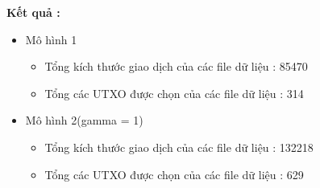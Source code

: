 \noindent
\textbf{Kết quả :}
\begin{itemize}
    \item Mô hình 1
    \begin{itemize}
        \item Tổng kích thước giao dịch của các file dữ liệu : 85470
        \item Tổng các UTXO được chọn của các file dữ liệu : 314
    \end{itemize}
    \item Mô hình 2(gamma = 1)
    \begin{itemize}
        \item Tổng kích thước giao dịch của các file dữ liệu : 132218
        \item Tổng các UTXO được chọn của các file dữ liệu : 629
    \end{itemize}
\end{itemize}